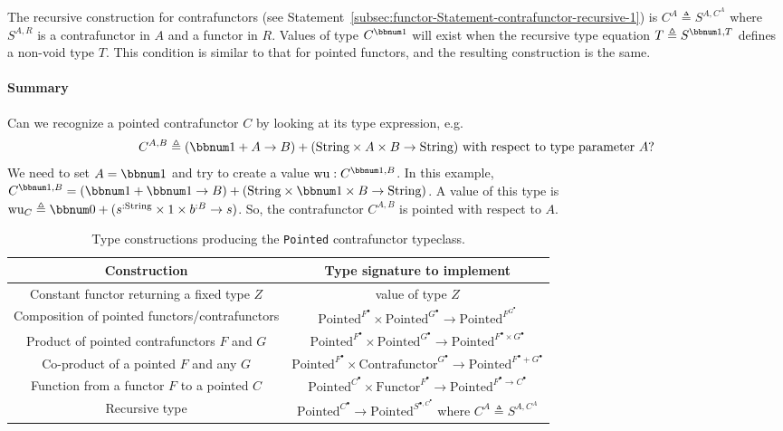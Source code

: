The recursive construction for contrafunctors (see Statement~\ref{subsec:functor-Statement-contrafunctor-recursive-1})
is $C^{A}\triangleq S^{A,C^{A}}$ where $S^{A,R}$ is a contrafunctor
in $A$ and a functor in $R$. Values of type $C^{\bbnum 1}$ will
exist when the recursive type equation $T\triangleq S^{\bbnum 1,T}$
defines a non-void type $T$. This condition is similar to that for
pointed functors, and the resulting construction is the same.

\paragraph{Summary}

Can we recognize a pointed contrafunctor $C$ by looking at its type
expression, e.g.
\[
C^{A,B}\triangleq\left(\bbnum 1+A\rightarrow B\right)+(\text{String}\times A\times B\rightarrow\text{String})\text{ with respect to type parameter }A?
\]
We need to set $A=\bbnum 1$ and try to create a value $\text{wu}:C^{\bbnum 1,B}$.
In this example, $C^{\bbnum 1,B}=\left(\bbnum 1+\bbnum 1\rightarrow B\right)+(\text{String}\times\bbnum 1\times B\rightarrow\text{String})$.
A value of this type is $\text{wu}_{C}\triangleq\bbnum 0+(s^{:\text{String}}\times1\times b^{:B}\rightarrow s)$.
So, the contrafunctor $C^{A,B}$ is pointed with respect to $A$.

\begin{table}
\begin{centering}
\begin{tabular}{|c|c|}
\hline 
\textbf{\footnotesize{}Construction} & \textbf{\footnotesize{}Type signature to implement}\tabularnewline
\hline 
\hline 
{\footnotesize{}Constant functor returning a fixed type $Z$} & {\footnotesize{}value of type $Z$}\tabularnewline
\hline 
{\footnotesize{}Composition of pointed functors/contrafunctors} & {\footnotesize{}$\text{Pointed}^{F^{\bullet}}\times\text{Pointed}^{G^{\bullet}}\rightarrow\text{Pointed}^{F^{G^{\bullet}}}$}\tabularnewline
\hline 
{\footnotesize{}Product of pointed contrafunctors $F$ and $G$} & {\footnotesize{}$\text{Pointed}^{F^{\bullet}}\times\text{Pointed}^{G^{\bullet}}\rightarrow\text{Pointed}^{F^{\bullet}\times G^{\bullet}}$}\tabularnewline
\hline 
{\footnotesize{}Co-product of a pointed $F$ and any $G$} & {\footnotesize{}$\text{Pointed}^{F^{\bullet}}\times\text{Contrafunctor}^{G^{\bullet}}\rightarrow\text{Pointed}^{F^{\bullet}+G^{\bullet}}$}\tabularnewline
\hline 
{\footnotesize{}Function from a functor $F$ to a pointed $C$} & {\footnotesize{}$\text{Pointed}^{C^{\bullet}}\times\text{Functor}^{F^{\bullet}}\rightarrow\text{Pointed}^{F^{\bullet}\rightarrow C^{\bullet}}$}\tabularnewline
\hline 
{\footnotesize{}Recursive type} & {\footnotesize{}$\text{Pointed}^{C^{\bullet}}\rightarrow\text{Pointed}^{S^{\bullet,C^{\bullet}}}$
where $C^{A}\triangleq S^{A,C^{A}}$}\tabularnewline
\hline 
\end{tabular}
\par\end{centering}
\caption{Type constructions producing the \lstinline!Pointed! contrafunctor
typeclass.\label{tab:Type-constructions-for-pointed-contrafunctor}}
\end{table}


